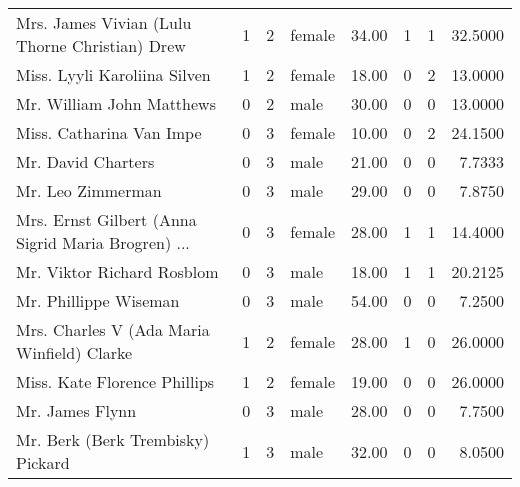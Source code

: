 \begin{tabular}{lrrlrrrr}
Mrs. James Vivian (Lulu Thorne Christian) Drew     &         1 &       2 &  female &  34.00 &                        1 &                        1 &   32.5000 \\
Miss. Lyyli Karoliina Silven                       &         1 &       2 &  female &  18.00 &                        0 &                        2 &   13.0000 \\
Mr. William John Matthews                          &         0 &       2 &    male &  30.00 &                        0 &                        0 &   13.0000 \\
Miss. Catharina Van Impe                           &         0 &       3 &  female &  10.00 &                        0 &                        2 &   24.1500 \\
Mr. David Charters                                 &         0 &       3 &    male &  21.00 &                        0 &                        0 &    7.7333 \\
Mr. Leo Zimmerman                                  &         0 &       3 &    male &  29.00 &                        0 &                        0 &    7.8750 \\
Mrs. Ernst Gilbert (Anna Sigrid Maria Brogren) ... &         0 &       3 &  female &  28.00 &                        1 &                        1 &   14.4000 \\
Mr. Viktor Richard Rosblom                         &         0 &       3 &    male &  18.00 &                        1 &                        1 &   20.2125 \\
Mr. Phillippe Wiseman                              &         0 &       3 &    male &  54.00 &                        0 &                        0 &    7.2500 \\
Mrs. Charles V (Ada Maria Winfield) Clarke         &         1 &       2 &  female &  28.00 &                        1 &                        0 &   26.0000 \\
Miss. Kate Florence Phillips                       &         1 &       2 &  female &  19.00 &                        0 &                        0 &   26.0000 \\
Mr. James Flynn                                    &         0 &       3 &    male &  28.00 &                        0 &                        0 &    7.7500 \\
Mr. Berk (Berk Trembisky) Pickard                  &         1 &       3 &    male &  32.00 &                        0 &                        0 &    8.0500 \\

\end{tabular}
